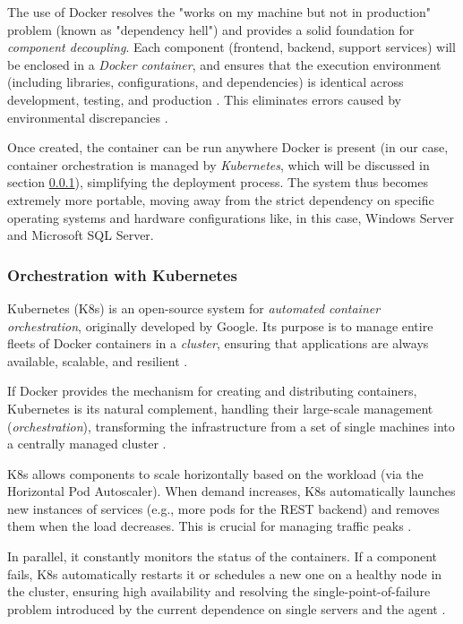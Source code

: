 The use of Docker resolves the "works on my machine but not in production" problem (known as "dependency hell") \cite{docker_swe} and provides a solid foundation for \textit{component decoupling}. Each component (frontend, backend, support services) will be enclosed in a \textit{Docker container}, and ensures that the execution environment (including libraries, configurations, and dependencies) is identical across development, testing, and production \cite{docker_swe}. 
This eliminates errors caused by environmental discrepancies \cite{docker_swe}.

Once created, the container can be run anywhere Docker is present (in our case, container orchestration is managed by \textit{Kubernetes}, which will be discussed in section \ref{sec:orchestration-kube}), simplifying the deployment process. 
The system thus becomes extremely more portable, moving away from the strict dependency on specific operating systems and hardware configurations like, in this case, Windows Server and Microsoft SQL Server.

\subsubsection{Orchestration with Kubernetes}\label{sec:orchestration-kube}
Kubernetes (K8s) is an open-source system for \textit{automated container orchestration}, originally developed by Google. Its purpose is to manage entire fleets of Docker containers in a \textit{cluster}, ensuring that applications are always available, scalable, and resilient \cite{borg-omega-kubernetes} \cite{kube_book}.

If Docker provides the mechanism for creating and distributing containers, Kubernetes is its natural complement, handling their large-scale management (\textit{orchestration}), transforming the infrastructure from a set of single machines into a centrally managed cluster \cite{kube_book}.

K8s allows components to scale horizontally based on the workload (via the Horizontal Pod Autoscaler). When demand increases, K8s automatically launches new instances of services (e.g., more pods for the REST backend) and removes them when the load decreases. This is crucial for managing traffic peaks \cite{kube_book}. 

In parallel, it constantly monitors the status of the containers. If a component fails, K8s automatically restarts it or schedules a new one on a healthy node in the cluster, ensuring high availability and resolving the single-point-of-failure problem introduced by the current dependence on single servers and the agent \cite{kube_book}. 

